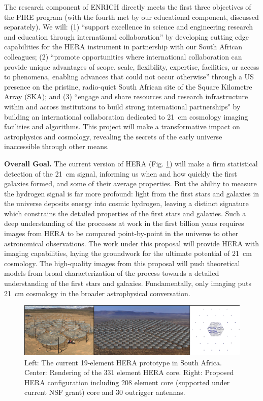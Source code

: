 \documentclass[preprint,11pt]{aastex}
\begin{document}
The research component of ENRICH directly meets the first three objectives of the PIRE program (with the fourth met by our educational component, discussed separately).  We will: (1) ``support excellence in science and engineering research and education through international collaboration'' by developing cutting edge capabilities for the HERA instrument in partnership with our South African colleagues; (2) ``promote opportunities where international collaboration can provide unique advantages of scope, scale, flexibility, expertise, facilities, or access to phenomena, enabling advances that could not occur otherwise'' through a US presence on the pristine, radio-quiet South African site of the Square Kilometre Array (SKA); and (3) ``engage and share resources and research infrastructure within and across institutions to build strong international partnerships" by building an international collaboration dedicated to 21\, cm cosmology imaging facilities and algorithms.  This project will make a transformative impact on astrophysics and cosmology, revealing the secrets of the early universe inaccessible through other means.   

\vspace{8pt}
\textbf{Overall Goal.} The current version of HERA (Fig. \ref{fig:research}) will make a firm statistical detection of the 21\, cm signal, informing us when and how quickly the first galaxies formed, and some of their average properties.  But the ability to measure the hydrogen signal is far more profound: light from the first stars and galaxies in the universe deposits energy into cosmic hydrogen, leaving a distinct signature which constrains the detailed properties of the first stars and galaxies.  Such a deep understanding of the processes at work in the first billion years requires images from HERA to be compared point-by-point in the universe to other astronomical observations.  The work under this proposal will provide HERA with imaging capabilities, laying the groundwork for the ultimate potential of 21\, cm cosmology.  The high-quality images from this proposal will push theoretical models from broad characterization of the process towards a detailed understanding of the first stars and galaxies.  Fundamentally, only imaging puts 21\, cm cosmology in the broader astrophysical conversation.  

\begin{figure}[!ht]
\centering
\includegraphics{research_fig.pdf}
\caption{Left: The current 19-element HERA prototype in South Africa.  Center: Rendering of the 331 element HERA core. Right: Proposed HERA configuration including 208 element core (supported under current NSF grant) core and 30 outrigger antennas.}
\label{fig:research}
\end{figure}
\end{document}
